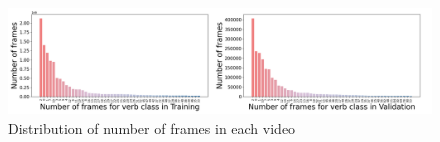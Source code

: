 

\begin{figure}[htp!]
\begin{minipage}[b]{1\textwidth}
    \centering
    \includegraphics[scale=0.31]{figures/total_frame_word.png}
    \caption{Distribution of number of frames in each video}
    \label{fig:total-frame}
\end{minipage}
\end{figure}